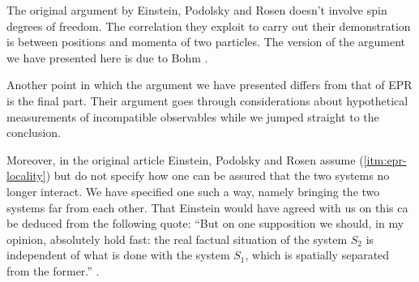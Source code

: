 \begin{observation}
  The original argument by Einstein, Podolsky and Rosen \cite{PhysRev.47.777} doesn't involve spin degrees of freedom. The correlation they exploit to carry out their demonstration is between positions and momenta of two particles. The version of the argument we have presented here is due to Bohm \cite{bohm1951quantum}.

  Another point in which the argument we have presented differs from that of EPR is the final part. Their argument goes through considerations about hypothetical measurements of incompatible observables while we jumped straight to the conclusion.

  Moreover, in the original article Einstein, Podolsky and Rosen assume (\ref{itm:epr-locality}) but do not specify how one can be assured that the two systems no longer interact. We have specified one such a way, namely bringing the two systems far from each other. That Einstein would have agreed with us on this ca be deduced from the following quote: ``But on one supposition we should, in my opinion, absolutely hold fast: the real factual situation of the system $S_2$ is independent of what is done with the system $S_1$, which is spatially separated from the former.'' \cite{schilpp1949albert}.%
\end{observation}
